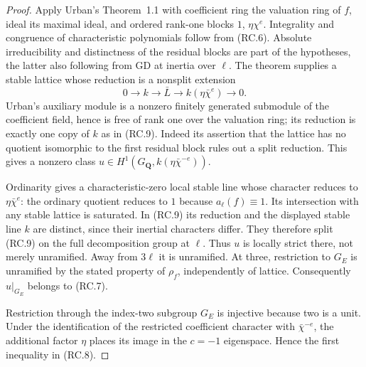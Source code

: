 \begin{proof}
Apply Urban's Theorem~1.1 with coefficient ring the
valuation ring of $f$, ideal its maximal ideal, and
ordered rank-one blocks $1$, $\eta\chi^e$.
Integrality and congruence of characteristic polynomials
follow from (RC.6).  Absolute irreducibility and
distinctness of the residual blocks are part of the
hypotheses, the latter also following from GD at
inertia over $\ell$.  The theorem supplies a stable
lattice whose reduction is a nonsplit extension
\[
 0\longrightarrow k\longrightarrow\bar L
       \longrightarrow k(\eta\bar\chi^e)
       \longrightarrow0.                                  \tag{RC.9}
\]
Urban's auxiliary module is a nonzero finitely generated
submodule of the coefficient field, hence is free of
rank one over the valuation ring; its reduction is
exactly one copy of $k$ as in (RC.9).
Indeed its assertion that the lattice has no quotient
isomorphic to the first residual block rules out a
split reduction.  This gives a nonzero class
$u\in H^1(G_{\mathbf Q},k(\eta\bar\chi^{-e}))$.

Ordinarity gives a characteristic-zero local stable
line whose character reduces to $\eta\bar\chi^e$:
the ordinary quotient reduces to $1$ because
$a_\ell(f)\equiv1$.  Its intersection with any stable
lattice is saturated.  In (RC.9) its reduction and the
displayed stable line $k$ are distinct, since their
inertial characters differ.  They therefore split
(RC.9) on the full decomposition group at $\ell$.
Thus $u$ is locally strict there, not merely
unramified.  Away from $3\ell$ it is unramified.
At three, restriction to $G_E$ is unramified by the
stated property of $\rho_f$, independently of lattice.
Consequently $u|_{G_E}$ belongs to (RC.7).

Restriction through the index-two subgroup $G_E$ is
injective because two is a unit.  Under the
identification of the restricted coefficient character
with $\bar\chi^{-e}$, the additional factor $\eta$
places its image in the $c=-1$ eigenspace.  Hence the
first inequality in (RC.8).


\end{proof}

